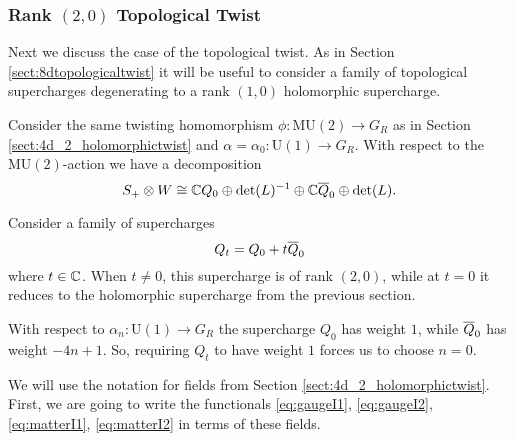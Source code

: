 \documentclass[10pt, oneside]{article}
\newcommand{\MU}{\mathrm{MU}}
\renewcommand{\U}{\mathrm{U}}
\begin{document}
\subsubsection{Rank \texorpdfstring{$(2,0)$}{(2,0)} Topological Twist}
\label{sect:4d2Donaldson}

Next we discuss the case of the topological twist. As in Section \ref{sect:8dtopologicaltwist} it will be useful to consider a family of topological supercharges degenerating to a rank $(1, 0)$ holomorphic supercharge.

Consider the same twisting homomorphism $\phi\colon \MU(2)\rightarrow G_R$ as in Section \ref{sect:4d_2_holomorphictwist} and $\alpha=\alpha_0\colon \U(1)\rightarrow G_R$. With respect to the $\MU(2)$-action we have a decomposition
\[S_+\otimes W\cong \CC Q_0 \oplus \det(L)^{-1}\oplus \CC \Bar{Q}_0\oplus \det(L).\]

Consider a family of supercharges
\begin{equation} 
\label{eq:4dHodgefamily}
Q_t = Q_0 + t \Bar{Q}_0
\end{equation}
where $t \in \CC$. When $t \ne 0$, this supercharge is of rank $(2,0)$, while at $t = 0$ it reduces to the holomorphic supercharge from the previous section.

\begin{remark}
With respect to $\alpha_n\colon \U(1)\rightarrow G_R$ the supercharge $Q_0$ has weight $1$, while $\Bar{Q}_0$ has weight $-4n+1$. So, requiring $Q_t$ to have weight $1$ forces us to choose $n=0$.
\end{remark}

We will use the notation for fields from Section \ref{sect:4d_2_holomorphictwist}. First, we are going to write the functionals \eqref{eq:gaugeI1}, \eqref{eq:gaugeI2}, \eqref{eq:matterI1}, \eqref{eq:matterI2} in terms of these fields.
\end{document}
